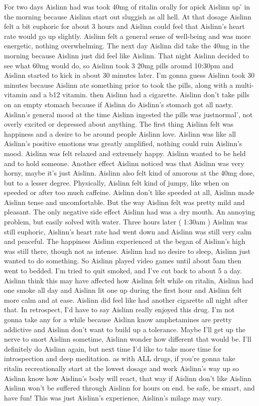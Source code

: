 \documentclass[12pt]{book}
\begin{document}
For two days Aislinn had was took 40mg of ritalin orally for apick Aislinn up' in the morning because Aislinn start out sluggish as all hell. At that dosage Aislinn felt a bit euphoric for about 3 hours and Aislinn could feel that Aislinn's heart rate would go up slightly. Aislinn felt a general sense of well-being and was more energetic, nothing overwhelming. The next day Aislinn did take the 40mg in the morning because Aislinn just did feel like Aislinn. That night Aislinn decided to see what 60mg would do, so Aislinn took 3 20mg pills around 10:30pm and Aislinn started to kick in about 30 minutes later. I'm gonna guess Aislinn took 30 minutes because Aislinn ate something prior to took the pills, along with a multi-vitamin and a b12 vitamin. then Aislinn had a cigarette. Aislinn don't take pills on an empty stomach because if Aislinn do Aislinn's stomach got all nasty. Aislinn's general mood at the time Aislinn ingested the pills was justnormal', not overly excited or depressed about anything. The first thing Aislinn felt was happiness and a desire to be around people Aislinn love. Aislinn was like all Aislinn's positive emotions was greatly amplified, nothing could ruin Aislinn's mood. Aislinn was felt relaxed and extremely happy. Aislinn wanted to be held and to hold someone. Another effect Aislinn noticed was that Aislinn was very horny, maybe it's just Aislinn. Aislinn also felt kind of amorous at the 40mg dose, but to a lesser degree. Physically, Aislinn felt kind of jumpy, like when on speeded or after too much caffeine. Aislinn don't like speeded at all, Aislinn made Aislinn tense and uncomfortable. But the way Aislinn felt was pretty mild and pleasant. The only negative side effect Aislinn had was a dry mouth. An annoying problem, but easily solved with water. Three hours later ( 1:30am ) Aislinn was still euphoric, Aislinn's heart rate had went down and Aislinn was still very calm and peaceful. The happiness Aislinn experienced at the began of Aislinn's high was still there, though not as intense. Aislinn had no desire to sleep, Aislinn just wanted to do something. So Aislinn played video games until about 5am then went to bedded. I'm tried to quit smoked, and I've cut back to about 5 a day. Aislinn think this may have affected how Aislinn felt while on ritalin, Aislinn had one smoke all day and Aislinn lit one up during the first hour and Aislinn felt more calm and at ease. Aislinn did feel like had another cigarette all night after that. In retrospect, I'd have to say Aislinn really enjoyed this drug. I'm not gonna take any for a while because Aislinn know amphetamines are pretty addictive and Aislinn don't want to build up a tolerance. Maybe I'll get up the nerve to snort Aislinn sometime, Aislinn wonder how different that would be. I'll definitely do Aislinn again, but next time I'd like to take more time for introspection and deep meditation. as with ALL drugs, if you're gonna take ritalin recreationally start at the lowest dosage and work Aislinn's way up so Aislinn know how Aislinn's body will react, that way if Aislinn don't like Aislinn Aislinn won't be suffered through Aislinn for hours on end. be safe, be smart, and have fun! This was just Aislinn's experience, Aislinn's milage may vary.
\end{document}
